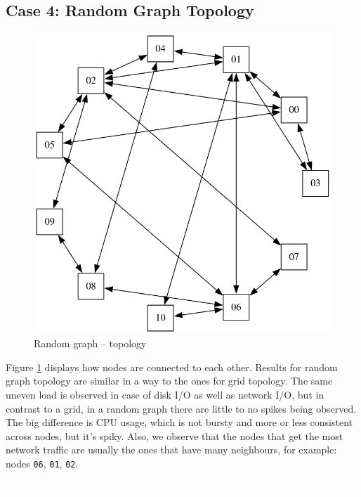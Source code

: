 \newpage
\subsection{Case 4: Random Graph Topology}

\begin{figure}
\centering
\captionsetup{justification=centering,width=0.8\linewidth}
\includegraphics[width=0.7\linewidth]{figures/topologies/graph-random.png}
\caption{Random graph -- topology}
\label{fig:graph-random-topology}
\end{figure}

Figure \ref{fig:graph-random-topology} displays how nodes are connected to each
other. Results for random graph topology are similar in a way to the ones for
grid topology. The same uneven load is observed in case of disk I/O as well as
network I/O, but in contrast to a grid, in a random graph there are little to
no spikes being observed. The big difference is CPU usage, which is not bursty
and more or less consistent across nodes, but it's spiky. Also, we observe that
the nodes that get the most network traffic are usually the ones that have many
neighbours, for example: nodes \verb|06|, \verb|01|, \verb|02|.

\textcolor{white}{.}\\\\\\\\\\\\

